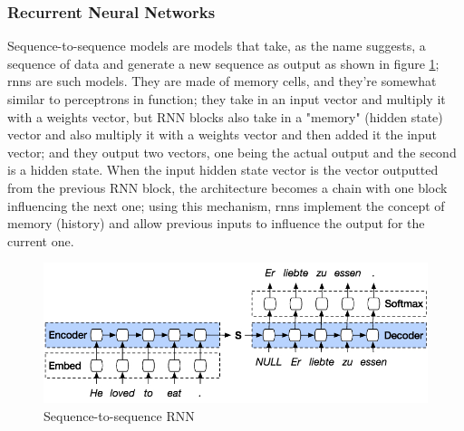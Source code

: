 \subsubsection*{Recurrent Neural Networks}

Sequence-to-sequence models are models that take, as the name suggests, a sequence of data and generate a new sequence as output as shown in figure \ref{fnd:seq2seq_rnn}; \gls{rnn}s are such models. They are made of memory cells, and they're somewhat similar to perceptrons in function; they take in an input vector and multiply it with a weights vector, but RNN blocks also take in a "memory" (hidden state) vector and also multiply it with a weights vector and then added it the input vector; and they output two vectors, one being the actual output and the second is a hidden state. When the input hidden state vector is the vector outputted from the previous RNN block, the architecture becomes a chain with one block influencing the next one; using this mechanism, \gls{rnn}s implement the concept of memory (history) and allow previous inputs to influence the output for the current one.

\begin{figure}[H]
        \centering
        \includegraphics[width=120mm]{figures/seq2seq_rnn.jpg}
        \caption{Sequence-to-sequence RNN \cite{johnson_seq2seq_2020}}
        \label{fnd:seq2seq_rnn}
\end{figure}

